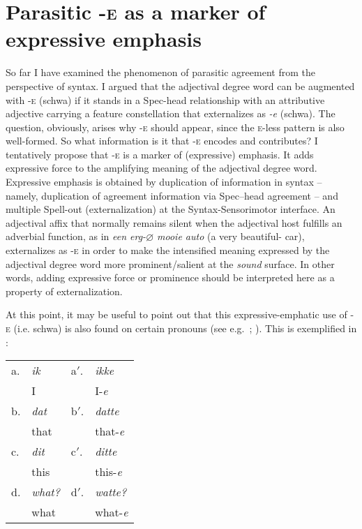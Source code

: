 \documentclass[output=paper]{langsci/langscibook}
\begin{document}
\section{Parasitic \textsc{-e} as a marker of expressive
emphasis}\label{sec:18.8}

So far I have examined the phenomenon of parasitic agreement from the
perspective of syntax. I argued that the adjectival degree word can be
augmented with \textsc{-e} (schwa) if it stands in a Spec-head relationship
with an attributive adjective carrying a feature constellation that
externalizes as \emph{-e} (schwa). The question, obviously, arises why
\textsc{-e} should appear, since the \textsc{e-}less pattern is also
well-formed. So what information is it that \textsc{-e} encodes and
contributes? I tentatively propose that \textsc{-e} is a marker of (expressive)
emphasis. It adds expressive force to the amplifying meaning of the adjectival
degree word. Expressive emphasis is obtained by duplication of information in
syntax – namely, duplication of agreement information via Spec--head agreement –
and multiple Spell-out (externalization) at the Syntax-Sensorimotor interface.
An adjectival affix that normally remains silent when the adjectival host
fulfills an adverbial function, as in \emph{een erg-${\varnothing}$ mooie auto}
(a very beautiful-\Agr{} car), externalizes as \textsc{-e} in order to make the
intensified meaning expressed by the adjectival degree word more
prominent/salient at the \emph{sound} surface. In other words, adding
expressive force or prominence should be interpreted here as a property of
externalization.

At this point, it may be useful to point out that this expressive-emphatic use
of \textsc{-e} (i.e. schwa) is also found on certain  pronouns (see
e.g.\ \citealt[237--238]{HaeserynEtAl1997}; \citealt{Hoeksema2000,Zwart2001}).
This is exemplified in :

\begin{exe}
    \ex\label{ex:18.55}
    \begin{tabularx}{.40\textwidth}[t]{llll}
        a. & \emph{ik} & a$'$. & \emph{ikke}\\
           & I & & I-\emph{e}\\
        b. & \emph{dat} & b$'$. & \emph{datte}\\
           & that & & that-\emph{e}\\
        c. & \emph{dit} & c$'$. & \emph{ditte}\\
           & this & & this-\emph{e}\\
        d. & \emph{what?} & d$'$. & \emph{watte?}\\
           & what & & what-\emph{e}\\
    \end{tabularx}
\end{exe}
\end{document}
